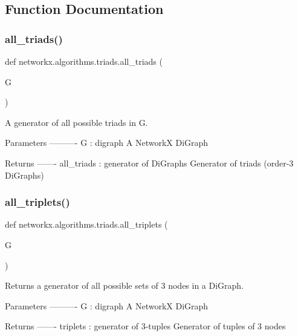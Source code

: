 \subsection{Function Documentation}
\mbox{\label{namespacenetworkx_1_1algorithms_1_1triads_a662f3ef88be1460e066f8340b568c4c8}} 
\subsubsection{\texorpdfstring{all\+\_\+triads()}{all\_triads()}}
{\footnotesize\ttfamily def networkx.\+algorithms.\+triads.\+all\+\_\+triads (\begin{DoxyParamCaption}\item[{}]{G }\end{DoxyParamCaption})}

\begin{DoxyVerb}A generator of all possible triads in G.

Parameters
----------
G : digraph
   A NetworkX DiGraph

Returns
-------
all_triads : generator of DiGraphs
   Generator of triads (order-3 DiGraphs)
\end{DoxyVerb}
 \mbox{\label{namespacenetworkx_1_1algorithms_1_1triads_a5e1dcc7531b5b1b5486369cf5aed74fd}} 
\subsubsection{\texorpdfstring{all\+\_\+triplets()}{all\_triplets()}}
{\footnotesize\ttfamily def networkx.\+algorithms.\+triads.\+all\+\_\+triplets (\begin{DoxyParamCaption}\item[{}]{G }\end{DoxyParamCaption})}

\begin{DoxyVerb}Returns a generator of all possible sets of 3 nodes in a DiGraph.

Parameters
----------
G : digraph
   A NetworkX DiGraph

Returns
-------
triplets : generator of 3-tuples
   Generator of tuples of 3 nodes
\end{DoxyVerb}
 \mbox{\label{namespacenetworkx_1_1algorithms_1_1triads_a8e517109435db9749833086107a52117}} 
